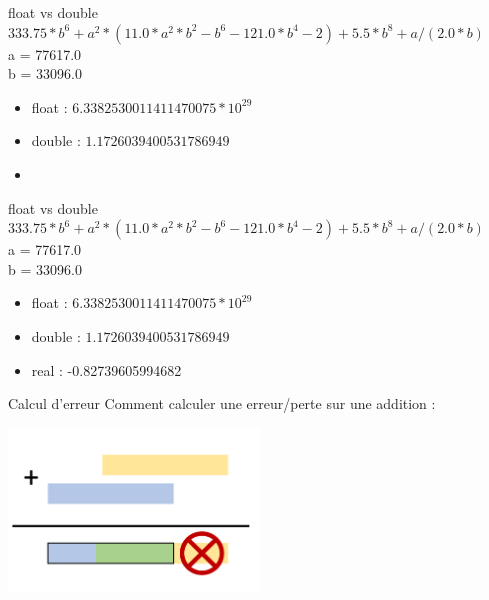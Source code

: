 \documentclass{beamer}
\begin{document}
  \begin{frame}{float vs double}
  $333.75*b^{6}+a^{2}*(11.0*a^{2}*b^{2}-b^{6}-121.0*b^{4}-2)+5.5*b^{8}+a/(2.0*b)$ \\
  a = 77617.0 \\
  b = 33096.0 \\
      \begin{itemize}
\item float : $6.3382530011411470075*10^{29}$
\item double : $1.1726039400531786949$
\item \textcolor{white}{ } 
    \end{itemize}
  \end{frame}
  
  \begin{frame}{float vs double}
  $333.75*b^{6}+a^{2}*(11.0*a^{2}*b^{2}-b^{6}-121.0*b^{4}-2)+5.5*b^{8}+a/(2.0*b)$ \\
  a = 77617.0 \\
  b = 33096.0 \\
      \begin{itemize}
\item float : $6.3382530011411470075*10^{29}$
\item double : $1.1726039400531786949$
\item real :  -0.82739605994682
    \end{itemize}
  \end{frame}  
  
  
    \begin{frame}{Calcul d'erreur}
    Comment calculer une erreur/perte sur une addition :
    \begin{center}
      \includegraphics[width=0.5\textwidth]{addition}
      \errorcomputing
      \end{center}
        \end{frame}
        
\end{document}
